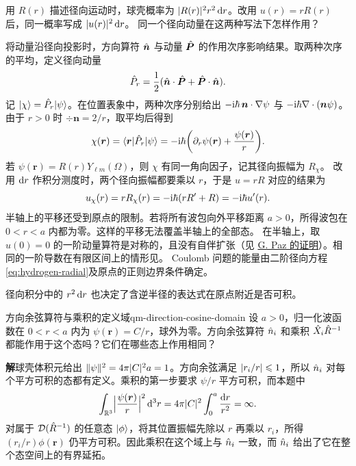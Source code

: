 \label{ss:qm-radial-momentum}
用 $R(r)$ 描述径向运动时，球壳概率为 $\lvert R(r)\rvert^2r^2\mathop{}\!\mathrm{d} r$。改用 $u(r) = rR(r)$ 后，同一概率写成 $\lvert u(r)\rvert^2\mathop{}\!\mathrm{d} r$。
同一个径向动量在这两种写法下怎样作用？

将动量沿径向投影时，方向算符 $\hat{\bm{n}}$ 与动量 $\hat{\bm{P}}$ 的作用次序影响结果。取两种次序的平均，定义径向动量
\begin{equation}\label{eq:qm-radial-momentum}
    \hat{P}_r = \frac12(\hat{\bm{n}} \cdot \hat{\bm{P}} + \hat{\bm{P}} \cdot \hat{\bm{n}}).
\end{equation}
记 $\lvert\chi\rangle = \hat{P}_r\lvert\psi\rangle$。在位置表象中，两种次序分别给出 $-\mathrm{i}\hbar\,\bm n \cdot \nabla\psi$ 与 $-\mathrm{i}\hbar\nabla\cdot(\bm n\psi)$。
由于 $r > 0$ 时 $\div\bm n = 2/r$，取平均后得到
\[
    \chi(\bm r) = \langle\bm r\vert\hat{P}_r\vert\psi\rangle
       = -\mathrm{i}\hbar\biggl(\partial_r\psi(\bm r) + \frac{\psi(\bm r)}{r}\biggr) .
\]
若 $\psi(\bm r) = R(r)Y_{\ell m}(\Omega)$，则 $\chi$ 有同一角向因子，记其径向振幅为 $R_\chi$。
改用 $\mathop{}\!\mathrm{d} r$ 作积分测度时，两个径向振幅都要乘以 $r$，于是 $u = rR$ 对应的结果为
\[
    u_\chi(r) = rR_\chi(r) = -\mathrm{i}\hbar(rR' + R) = -\mathrm{i}\hbar u'(r) .
\]
半轴上的平移还受到原点的限制。若将所有波包向外平移距离 $a > 0$，所得波包在 $0 < r < a$ 内都为零。这样的平移无法覆盖半轴上的全部态。
在半轴上，取 $u(0) = 0$ 的一阶动量算符是对称的，且没有自伴扩张（见 \href{https://arxiv.org/abs/math-ph/0009016}{G. Paz 的证明}）。相同的一阶导数在有限区间上的情形见。
Coulomb 问题的能量由二阶径向方程\eqref{eq:hydrogen-radial}及原点的正则边界条件确定。

径向积分中的 $r^2\mathop{}\!\mathrm{d} r$ 也决定了含逆半径的表达式在原点附近是否可积。

\begin{example}{方向余弦算符与乘积的定义域}{qm-direction-cosine-domain}
    设 $a > 0$，归一化波函数在 $0 < r < a$ 内为 $\psi(\bm r) = C/r$，球外为零。方向余弦算符 $\hat{n}_i$ 和乘积 $\hat{X}_i\hat{R}^{-1}$ 都能作用于这个态吗？它们在哪些态上作用相同？

    \par\smallskip\textbf{解}\quad 球壳体积元给出 $\lVert\psi\rVert^2 = 4\pi\lvert C\rvert^2 a = 1$。方向余弦满足 $\lvert r_i/r\rvert \leqslant 1$，所以 $\hat{n}_i$ 对每个平方可积的态都有定义。乘积的第一步要求 $\psi/r$ 平方可积，而本题中
    \[
        \int_{\mathbb{R}^3}\Bigl\lvert\frac{\psi(\bm r)}{r}\Bigr\rvert^2 \mathop{}\!\mathrm{d}^3 r
        = 4\pi\lvert C\rvert^2 \int_0^a \frac{\mathop{}\!\mathrm{d} r}{r^2} = \infty .
    \]
    对属于 $\mathcal D(\hat{R}^{-1})$ 的任意态 $\lvert\phi\rangle$，将其位置振幅先除以 $r$ 再乘以 $r_i$，所得 $(r_i/r)\phi(\bm r)$ 仍平方可积。因此乘积在这个域上与 $\hat{n}_i$ 一致，而 $\hat{n}_i$ 给出了它在整个态空间上的有界延拓。
\end{example}


